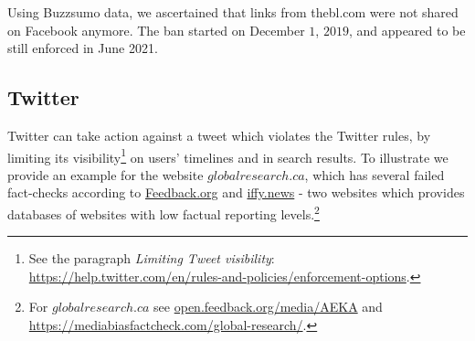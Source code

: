 \documentclass{article}
\begin{document}
Using Buzzsumo data, we ascertained that links from thebl.com were not shared on Facebook anymore. The ban started on December $1$, $2019$, and appeared to be still enforced in June 2021.

\subsection{Twitter}  \label{globalresearch}

Twitter can take action against a tweet which violates the Twitter rules, by limiting its visibility\footnote{See the paragraph {\it Limiting Tweet visibility}: \href{https://help.twitter.com/en/rules-and-policies/enforcement-options}{https://help.twitter.com/en/rules-and-policies/enforcement-options}.} on users' timelines and in search results. To illustrate we provide an example for the website $globalresearch.ca$, which has several failed fact-checks according to \href{https://open.feedback.org/media/AEKA}{Feedback.org} and \href{https://iffy.news}{iffy.news} - two websites which provides databases of websites with low factual reporting levels.\footnote{For $globalresearch.ca$ see \href{https://open.feedback.org/media/AEKA}{open.feedback.org/media/AEKA} and \href{https://mediabiasfactcheck.com/global-research/}{https://mediabiasfactcheck.com/global-research/}.}

\end{document}
